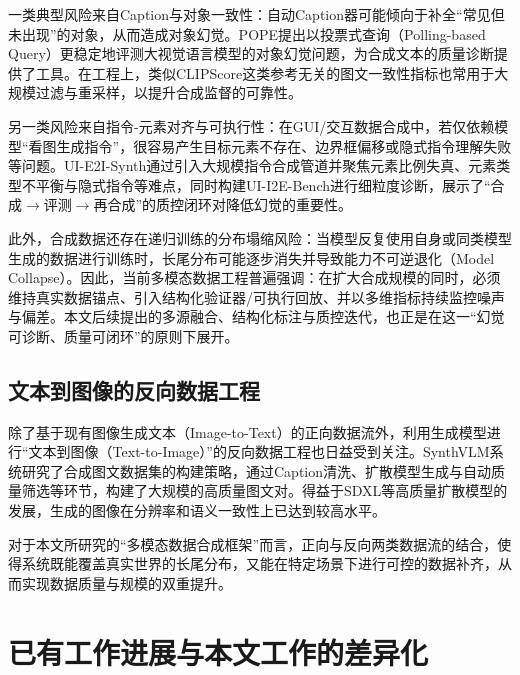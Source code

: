 一类典型风险来自Caption与对象一致性：自动Caption器可能倾向于补全“常见但未出现”的对象，从而造成对象幻觉。POPE提出以投票式查询（Polling-based Query）更稳定地评测大视觉语言模型的对象幻觉问题，为合成文本的质量诊断提供了工具\citep{li2023pope}。在工程上，类似CLIPScore这类参考无关的图文一致性指标也常用于大规模过滤与重采样，以提升合成监督的可靠性\citep{hessel2021clipscore}。

另一类风险来自指令-元素对齐与可执行性：在GUI/交互数据合成中，若仅依赖模型“看图生成指令”，很容易产生目标元素不存在、边界框偏移或隐式指令理解失败等问题。UI-E2I-Synth通过引入大规模指令合成管道并聚焦元素比例失真、元素类型不平衡与隐式指令等难点，同时构建UI-I2E-Bench进行细粒度诊断，展示了“合成$\rightarrow$评测$\rightarrow$再合成”的质控闭环对降低幻觉的重要性\citep{liu2025uie2isynth}。

此外，合成数据还存在递归训练的分布塌缩风险：当模型反复使用自身或同类模型生成的数据进行训练时，长尾分布可能逐步消失并导致能力不可逆退化（Model Collapse）\citep{shumailov2023curse}。因此，当前多模态数据工程普遍强调：在扩大合成规模的同时，必须维持真实数据锚点、引入结构化验证器/可执行回放、并以多维指标持续监控噪声与偏差。本文后续提出的多源融合、结构化标注与质控迭代，也正是在这一“幻觉可诊断、质量可闭环”的原则下展开。

\subsection{文本到图像的反向数据工程}
除了基于现有图像生成文本（Image-to-Text）的正向数据流外，利用生成模型进行“文本到图像（Text-to-Image）”的反向数据工程也日益受到关注。SynthVLM系统研究了合成图文数据集的构建策略，通过Caption清洗、扩散模型生成与自动质量筛选等环节，构建了大规模的高质量图文对\citep{liu2025synthvlm}。得益于SDXL等高质量扩散模型的发展，生成的图像在分辨率和语义一致性上已达到较高水平\citep{podell2023sdxl}。

对于本文所研究的“多模态数据合成框架”而言，正向与反向两类数据流的结合，使得系统既能覆盖真实世界的长尾分布，又能在特定场景下进行可控的数据补齐，从而实现数据质量与规模的双重提升。

\section{已有工作进展与本文工作的差异化}

